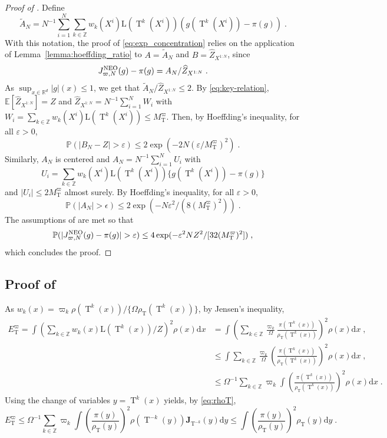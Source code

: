 \documentclass{article}
\def\IFIS{\ensuremath{\operatorname{NEO}}}
\def\NEO{{\small \IFIS}}
\def\transfo{\operatorname{T}}
\def\rmd{\operatorname{d}\hspace{-2pt}}
\def\rset{\mathbb{R}}
\def\rmd{\mathrm{d}}
\def\eqsp{\,}
\newcommand{\abs}[1]{\left\vert #1 \right\vert}
\def\eqsp{\;}
\newcommand{\1}{\mathds{1}}
\newcommand{\chunku}[3]{#1^{#2:#3}}
\def\Jac{\mathbf{J}}
\newcommand{\JacOp}[1]{\Jac_{#1}}
\def\const{Z}
\newcommand{\estConstC}[1]{\widehat{Z}_{#1}}
\def\rset{\mathbb{R}}
\def\zset{\mathbb{Z}}
\def\rmd{\mathrm{d}}
\def\likelihood{\mathrm{L}}
\def\rhoT{\rho_{\transfo}}
\def\bound{M_{\transfo}^{\varpi}}
\def\infineSNIS{J^{\NEO}_{\varpi,N}}
\begin{document}
\begin{proof}[Proof of ]
 Define
 \begin{equation*}
   \tilde{A}_N = N^{-1} \sum_{i=1}^N \sum_{k \in \zset} w_k(X^i) \likelihood(\transfo^k(X^i))\left(g(\transfo^k(X^i)) - \pi(g)\right)  \eqsp.
 \end{equation*}
 With this notation, the proof of \eqref{eq:exp_concentration} relies on the application of Lemma~\ref{lemma:hoeffding_ratio} to $A = \tilde{A}_N$ and $B = \estConstC{\chunku{X}{1}{N}}$, since
 $$ \infineSNIS(g) - \pi(g) = A_N / \estConstC{\chunku{X}{1}{N}}\eqsp.$$
As $\sup_{x \in \rset^d} \abs{g}(x) \leq 1$, we get that $\tilde{A}_N / \estConstC{\chunku{X}{1}{N}} \leq 2$.
By \eqref{eq:key-relation}, $\mathbb{E}[\estConstC{\chunku{X}{1}{N}}] =\const$ and $\estConstC{\chunku{X}{1}{N}} = N^{-1} \sum_{i=1}^N W_i $ with $W_i =  \sum_{k \in\zset} w_k(X^i) \likelihood(\transfo^k(X^i)) \leq \bound$. Then, by Hoeffding's inequality, for all $\varepsilon > 0$,
$$ \mathbb{P}(|B_N - \const| > \varepsilon) \leq 2\exp(-2N(\varepsilon/\bound)^2)\eqsp.$$
Similarly, $A_N$ is centered and $A_N= N^{-1} \sum_{i=1}^N U_i $ with $$U_i =  \sum_{k \in\zset} w_k(X^i) \likelihood(\transfo^k(X^i))\{g(\transfo^k(X^i)) -\pi(g)\}$$ and $\abs{U_i}  \leq 2\bound$ almost surely. By Hoeffding's inequality, for all $\varepsilon > 0$,
$$ \mathbb{P}(\left|A_N\right| > \epsilon) \leq 2\exp(-N\varepsilon^2/(8(\bound)^2))\eqsp.$$
The assumptions of  are met so that
$$ \mathbb{P}(|\infineSNIS(g) - \pi(g) | > \varepsilon) \leq 4\exp(-\varepsilon^2N \const^2/[32(\bound)^2])\eqsp,$$
which concludes the proof.
\end{proof}

\subsection{Proof of }
\label{sec:proof_lem:chi2_E_T}
As $w_k(x) = \varpi_k \rho(\transfo^k(x))/\{\Omega\rhoT(\transfo^k(x)) \}$, by Jensen's inequality,
\begin{align*}
    E_{\transfo}^{\varpi} = \int \left( \sum_{k\in\zset} w_k(x) \likelihood(\transfo^k(x))/\const\right)^2 \rho(x)\rmd x &= \int \left( \sum_{k\in\zset} \frac{\varpi_k}{\Omega} \frac{\pi(\transfo^k(x))}{\rhoT(\transfo^k(x))}\right)^2 \rho(x)\rmd x\eqsp,\\
    &\leq \int  \sum_{k\in\zset} \frac{\varpi_k}{\Omega} \left(\frac{\pi(\transfo^k(x))}{\rhoT(\transfo^k(x))}\right)^2 \rho(x)\rmd x\eqsp, \\
    &\leq  \Omega^{-1}\sum_{k\in\zset} \varpi_k \int  \left(\frac{\pi(\transfo^k(x))}{\rhoT(\transfo^k(x))}\right)^2 \rho(x)\rmd x\eqsp.
\end{align*}
Using the change of variables $y= \transfo^k(x)$ yields, by \eqref{eq:rhoT},
$$
    E_{\transfo}^{\varpi} \leq \Omega^{-1}\sum_{k\in\zset} \varpi_k \int  \left(\frac{\pi(y)}{\rhoT(y)}\right)^2 \rho(\transfo^{-k}(y))\JacOp{\transfo^{-k}}(y)\rmd y\leq \int\left(\frac{\pi(y)}{\rhoT(y)}\right)^2\rhoT(y) \rmd y\eqsp.
$$
\end{document}
